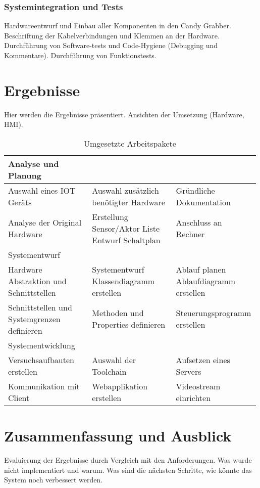 \documentclass[BMR,Bachelor,ngerman]{twbook}%
\begin{document}
\subsection{Systemintegration und Tests}
Hardwareentwurf und Einbau aller Komponenten in den Candy Grabber. Beschriftung der Kabelverbindungen und Klemmen an der Hardware. Durchführung von Software-tests und Code-Hygiene (Debugging und Kommentare). Durchführung von Funktionstests.
%
\clearpage
\chapter{Ergebnisse}
Hier werden die Ergebnisse präsentiert. Ansichten der Umsetzung (Hardware, HMI).
\begin{table}[!htbp]
\caption{Umgesetzte Arbeitspakete}
\centering
\begin{tabular}{| p{0.33\linewidth}| p{0.33\linewidth} | p{0.33\linewidth}|}\hline
\rowcolor[gray]{0.8}Analyse und Planung & &\\\hline
Auswahl eines \ac{IOT} Geräts & Auswahl zusätzlich benötigter Hardware & Gründliche Dokumentation\\\hline
Analyse der Original Hardware & Erstellung Sensor/Aktor Liste \newline Entwurf Schaltplan & Anschluss an Rechner\\\hline
\rowcolor[gray]{0.8}Systementwurf &&\\\hline
Hardware Abstraktion und Schnittstellen & Systementwurf \newline Klassendiagramm erstellen & Ablauf planen \newline Ablaufdiagramm erstellen\\\hline
Schnittstellen und Systemgrenzen definieren & Methoden und Properties \newline definieren & Steuerungsprogramm erstellen\\\hline
\rowcolor[gray]{0.8}Systementwicklung &&\\\hline
Versuchsaufbauten erstellen & Auswahl der Toolchain &  Aufsetzen eines Servers \\\hline
Kommunikation mit Client & Webapplikation erstellen & Videostream einrichten\\\hline
\end{tabular}
\end{table}
%
\clearpage
\chapter{Zusammenfassung und Ausblick}
Evaluierung der Ergebnisse durch Vergleich mit den Anforderungen. Was wurde nicht implementiert und warum. Was sind die nächsten Schritte, wie könnte das System noch verbessert werden.
%
\end{document}
